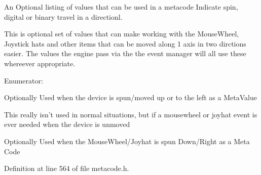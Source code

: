 An Optional listing of values that can be used in a metacode Indicate spin, digital or binary travel in a directionl. 

This is optional set of values that can make working with the MouseWheel, Joystick hats and other items that can be moved along 1 axis in two dirctions easier. The values the engine pass via the the event manager will all use these whereever appropriate. \begin{Desc}
\item[Enumerator: ]\par
\begin{description}
\item[{\em 
\hypertarget{classphys_1_1MetaCode_ad6ed6266b5f4219a6f5da29ebe018757ae4b09c3b8e79b189d9fbc2ea8a1bcade}{
DIRECTIONALMOTION\_\-UPLEFT}
\label{da/dc9/classphys_1_1MetaCode_ad6ed6266b5f4219a6f5da29ebe018757ae4b09c3b8e79b189d9fbc2ea8a1bcade}
}]Optionally Used when the device is spun/moved up or to the left as a MetaValue \item[{\em 
\hypertarget{classphys_1_1MetaCode_ad6ed6266b5f4219a6f5da29ebe018757a01bfdb29aaa2cb816b704667d5cc348f}{
DIRECTIONALMOTION\_\-UNCHANGED}
\label{da/dc9/classphys_1_1MetaCode_ad6ed6266b5f4219a6f5da29ebe018757a01bfdb29aaa2cb816b704667d5cc348f}
}]This really isn't used in normal situations, but if a mousewheel or joyhat event is ever needed when the device is unmoved \item[{\em 
\hypertarget{classphys_1_1MetaCode_ad6ed6266b5f4219a6f5da29ebe018757af4a101f9bcd1baedca43bacd3845eb41}{
DIRECTIONALMOTION\_\-DOWNRIGHT}
\label{da/dc9/classphys_1_1MetaCode_ad6ed6266b5f4219a6f5da29ebe018757af4a101f9bcd1baedca43bacd3845eb41}
}]Optionally Used when the MouseWheel/Joyhat is spun Down/Right as a Meta Code \end{description}
\end{Desc}



Definition at line 564 of file metacode.h.

